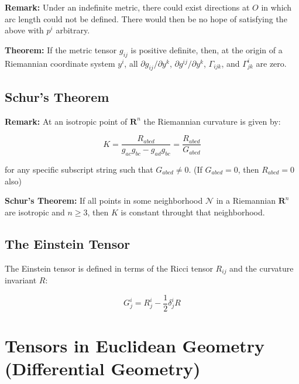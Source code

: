 \documentclass{article}
\begin{document}
\noindent \textbf{Remark: }
Under an indefinite metric, there could exist directions at $O$ in which arc length could not be defined.  There would then be no hope of satisfying the above with $p^i$ arbitrary.

\noindent \textbf{Theorem: }
If the metric tensor $g_{ij}$ is positive definite, then, at the origin of a Riemannian coordinate system $y^i$, all $\partial g_{ij} / \partial y^k$, $\partial g^{ij} / \partial y^k$, $\Gamma_{ijk}$, and $\Gamma^i_{jk}$ are zero.


\subsection{Schur's Theorem}

\noindent \textbf{Remark: }
At an isotropic point of $\mathbf{ R }^n$ the Riemannian curvature is given by:

\begin{equation}
	K = \frac{ R_{abcd} }{ g_{ac} g_{bc} - g_{ad} g_{bc} } = \frac{ R_{abcd} }{ G_{abcd} }
\end{equation}

\noindent for any specific subscript string such that $G_{abcd} \neq 0$. (If $G_{abcd} = 0$, then $R_{abcd} = 0$ also)

\noindent \textbf{Schur's Theorem: }
If all points in some neighborhood $\mathscr{ N }$ in a Riemannian $\mathbf{ R }^n$ are isotropic and $n \geq 3$, then $K$ is constant throught that neighborhood.


\subsection{The Einstein Tensor}

The Einstein tensor is defined in terms of the Ricci tensor $R_{ij}$ and the curvature invariant $R$:

\begin{equation}
	G^i_j = R^i_j - \frac{ 1 }{ 2 } \delta^i_j R
\end{equation}



















%
%
\newpage
\section{Tensors in Euclidean Geometry (Differential Geometry)}
\end{document}
